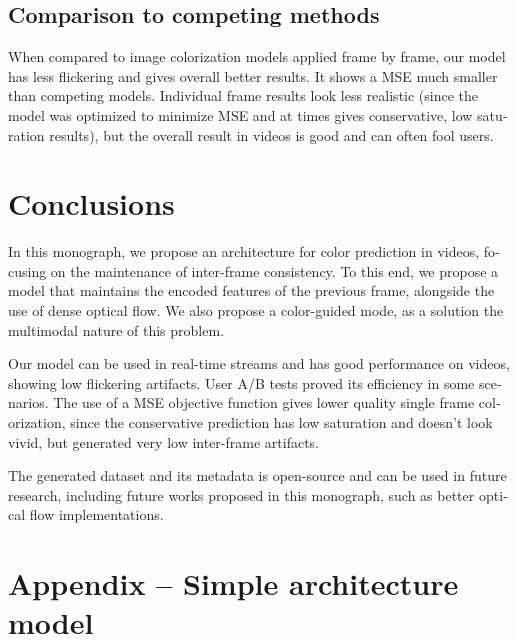 \documentclass[12pt,openright,oneside,a4paper,english, brazilian]{abntex2}
\begin{document}
\begin{otherlanguage}{english}
\section{Comparison to competing methods}
When compared to image colorization models applied frame by frame, our model has less flickering and gives overall better results. It shows a MSE much smaller than competing models. Individual frame results look less realistic (since the model was optimized to minimize MSE and at times gives conservative, low saturation results), but the overall result in videos is good and can often fool users.

\chapter{Conclusions}
In this monograph, we propose an architecture for color prediction in videos, focusing on the maintenance of inter-frame consistency. To this end, we propose a model that maintains the encoded features of the previous frame, alongside the use of dense optical flow. We also propose a color-guided mode, as a solution the multimodal nature of this problem.

Our model can be used in real-time streams and has good performance on videos, showing low flickering artifacts. User A/B tests proved its efficiency in some scenarios. The use of a MSE objective function gives lower quality single frame colorization, since the conservative prediction has low saturation and doesn't look vivid, but generated very low inter-frame artifacts.

The generated dataset and its metadata is open-source and can be used in future research, including future works proposed in this monograph, such as better optical flow implementations.




\appendix
\chapter{Appendix -- Simple architecture model}


\end{otherlanguage}
\end{document}

